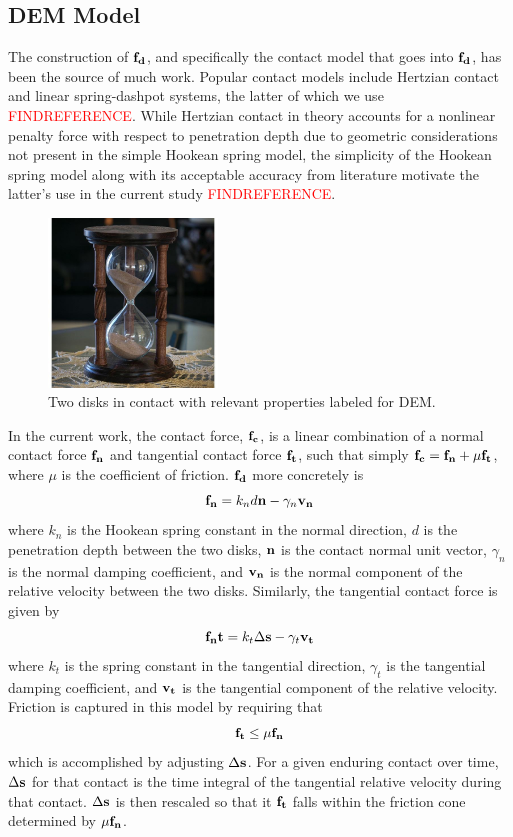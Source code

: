 \subsection{DEM Model} \label{DEM_Model}
The construction of $\bold{f_d}$, and specifically the contact model that goes into $\bold{f_d}$, has been the source of much work. Popular contact models include Hertzian contact and linear spring-dashpot systems, the latter of which we use \textcolor{red}{FINDREFERENCE}. While Hertzian contact in theory accounts for a nonlinear penalty force with respect to penetration depth due to geometric considerations not present in the simple Hookean spring model, the simplicity of the Hookean spring model along with its acceptable accuracy from literature motivate the latter's use in the current study \textcolor{red}{FINDREFERENCE}. 

\begin{figure}[htp] 
    \centering
    \includegraphics[width=0.4\textwidth]{figs/hourglass_whole.jpg}
    \caption{Two disks in contact with relevant properties labeled for DEM.}
    \label{DEM_diagram}
\end{figure}

In the current work, the contact force, $\bold{f_c}$, is a linear combination of a normal contact force $\bold{f_n}$ and tangential contact force $\bold{f_t}$, such that simply $\bold{f_c} = \bold{f_n} + \mu\bold{f_t}$, where $\mu$ is the coefficient of friction. $\bold{f_d}$ more concretely is
$$\bold{f_n}=k_nd\bold{n}-\gamma_n\bold{v_n}$$
where $k_n$ is the Hookean spring constant in the normal direction, $d$ is the penetration depth between the two disks, $\bold{n}$ is the contact normal unit vector, $\gamma_n$ is the normal damping coefficient, and $\bold{v_n}$ is the normal component of the relative velocity between the two disks. Similarly, the tangential contact force is given by
$$\bold{f_nt}=k_t\Delta\bold{s}-\gamma_t\bold{v_t}$$
where $k_t$ is the spring constant in the tangential direction, $\gamma_t$ is the tangential damping coefficient, and $\bold{v_t}$ is the tangential component of the relative velocity. Friction is captured in this model by requiring that
$$\bold{f_t}\leq\mu\bold{f_n}$$
which is accomplished by adjusting $\Delta\bold{s}$. For a given enduring contact over time, $\Delta\bold{s}$ for that contact is the time integral of the tangential relative velocity during that contact. $\Delta\bold{s}$ is then rescaled so that it $\bold{f_t}$ falls within the friction cone determined by $\mu\bold{f_n}$.

